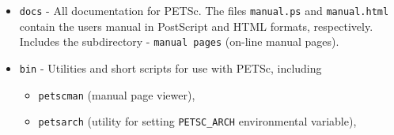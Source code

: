 \begin{itemize}
\item {\tt docs} - All documentation for PETSc. The files {\tt manual.ps}
                   and {\tt manual.html} contain the users manual in
                   PostScript and HTML formats, respectively. Includes
                   the subdirectory
 \subitem - {\tt manual pages} (on-line manual pages).
\item {\tt bin} - Utilities and short scripts for use with PETSc, including
 \begin{itemize}
 \item {\tt petscman} (manual page viewer),
 \item {\tt petsarch} (utility for setting {\tt PETSC\_ARCH} environmental variable),
 \end{itemize}


\end{itemize}
